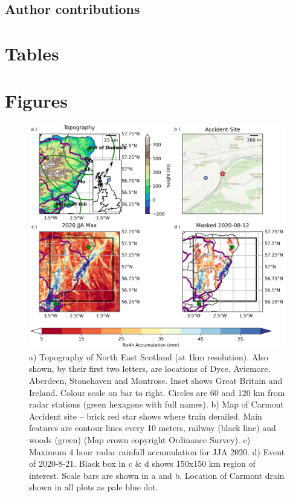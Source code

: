 \documentclass[11pt,a4paper]{article}
\begin{document}
\subsection*{Author contributions}


\section*{Tables}






\FloatBarrier
\clearpage
\section*{Figures}
\begin{figure}[ht!] %
	
	\centering
	\includegraphics[width=\linewidth]{carmont_geog_group}
	\caption{a) Topography of North East Scotland (at 1km resolution). Also shown, by their first two letters, are locations of Dyce, Aviemore, Aberdeen, Stonehaven and Montrose. Inset shows Great Britain and Ireland. Colour scale on bar to right. Circles are  60 and 120 km from radar stations (green hexagons with full names). b)  Map of Carmont Accident site -- brick red star shows where train derailed. Main features are contour lines every 10 meters, railway (black line) and woods (green) (Map crown copyright Ordinance Survey).  c) Maximum 4 hour radar rainfall accumulation  for JJA 2020. d) Event of 2020-8-21.  Black box in c \& d shows 150x150 km region of interest. Scale bars are shown in a and b. Location of Carmont drain shown in all plots as pale blue dot.  }
	\label{fig:carmont_geog_group}
\end{figure}
\end{document}
